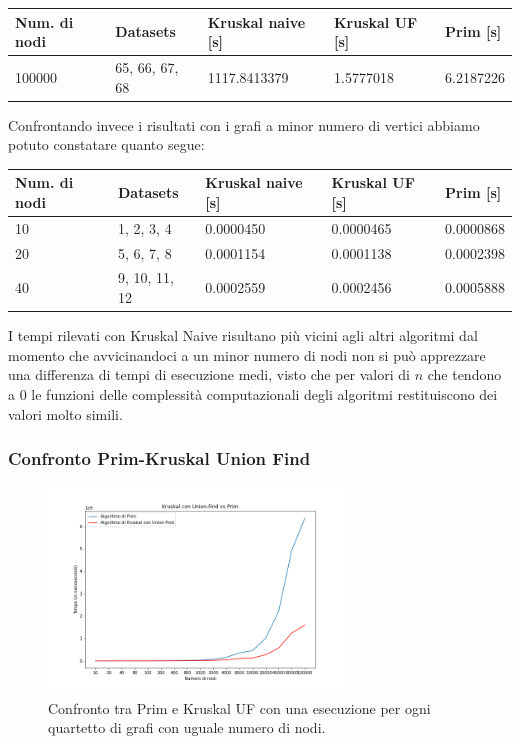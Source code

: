 \begin{table}[H]\centering
	\begin{tabular}{l|l|l|l|l}
        \textbf{Num. di nodi} & \textbf{Datasets} & \textbf{Kruskal naive [s]} & \textbf{Kruskal UF [s]} & \textbf{Prim [s]} \\
    \hline
	100000 & 65, 66, 67, 68 & 1117.8413379  & 1.5777018  & 6.2187226 
	\end{tabular}
\end{table}

Confrontando invece i risultati con i grafi a minor numero di vertici abbiamo potuto constatare quanto segue:

\begin{table}[H]\centering
	\begin{tabular}{l|l|l|l|l}
        \textbf{Num. di nodi} & \textbf{Datasets} & \textbf{Kruskal naive [s]} & \textbf{Kruskal UF [s]} & \textbf{Prim [s]} \\
    \hline
	10 & 1, 2, 3, 4  & 0.0000450 & 0.0000465 & 0.0000868 \\
    20 & 5, 6, 7, 8  & 0.0001154 & 0.0001138  & 0.0002398 \\
    40 & 9, 10, 11, 12  & 0.0002559 & 0.0002456  & 0.0005888 \\
	\end{tabular}
\end{table}

\noindent I tempi rilevati con Kruskal Naive risultano più vicini agli altri algoritmi dal momento che avvicinandoci a un minor numero di nodi non si può apprezzare una differenza di tempi di esecuzione medi, visto che per valori di \(n\) che tendono a 0 le funzioni delle complessità computazionali degli algoritmi restituiscono dei valori molto simili. 

\subsubsection{Confronto Prim-Kruskal Union Find}


\begin{figure}[H]
	\centering
	\includegraphics[width=0.7\textwidth]{res/images/graph-no-rep/kruskal_uf_vs_prim_senza_ripetizioni.png}
    \caption{Confronto tra Prim e Kruskal UF con una esecuzione per ogni quartetto di grafi con uguale numero di nodi.}
	\label{fig:krukal_vs_primnr}
\end{figure}


